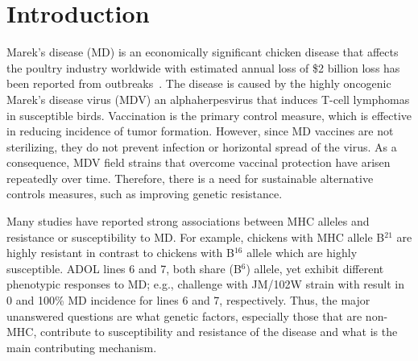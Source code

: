 \documentclass[10pt]{article}
\begin{document}
\section*{Introduction}

Marek's disease (MD) is an economically significant chicken disease that affects the
poultry industry worldwide with estimated annual loss of
\$2 billion loss has been reported from outbreaks~\cite{morrow2004marek}.
The disease is caused by the highly oncogenic Marek's disease virus (MDV)
an alphaherpesvirus that induces T-cell lymphomas in susceptible birds.
Vaccination is the primary control measure, which is effective in reducing
incidence of tumor formation.
However, since MD vaccines are not sterilizing, they do not prevent infection or
horizontal spread of the virus.
As a consequence, MDV field strains that overcome vaccinal protection have arisen repeatedly over time.
Therefore, there is a need for sustainable alternative controls measures, such as improving genetic
resistance.

Many studies have reported strong associations between MHC alleles and resistance or susceptibility to
MD. For example, chickens with MHC allele B$^{21}$ are highly resistant in contrast to chickens with
B$^{16}$ allele which are highly susceptible.
ADOL lines 6 and 7, both share (B$^6$) allele, yet exhibit different phenotypic responses to
MD; e.g., challenge with JM/102W strain with result in 0 and 100\% MD incidence for lines 6 and 7,
respectively.
Thus, the major unanswered questions are what genetic factors, especially those that are non-MHC,
contribute to susceptibility and resistance of the disease and what is the main contributing
mechanism.
\end{document}
